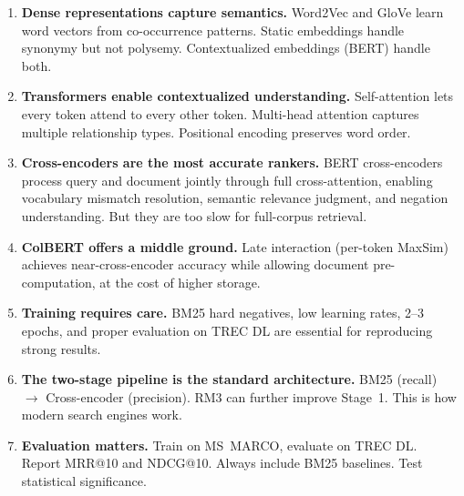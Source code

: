 \documentclass[11pt,a4paper]{article}
\theoremstyle{definition}
\theoremstyle{plain}
\begin{document}
\begin{enumerate}
    \item \textbf{Dense representations capture semantics.} Word2Vec and GloVe learn word vectors from co-occurrence patterns. Static embeddings handle synonymy but not polysemy. Contextualized embeddings (BERT) handle both.
    
    \item \textbf{Transformers enable contextualized understanding.} Self-attention lets every token attend to every other token. Multi-head attention captures multiple relationship types. Positional encoding preserves word order.
    
    \item \textbf{Cross-encoders are the most accurate rankers.} BERT cross-encoders process query and document jointly through full cross-attention, enabling vocabulary mismatch resolution, semantic relevance judgment, and negation understanding. But they are too slow for full-corpus retrieval.
    
    \item \textbf{ColBERT offers a middle ground.} Late interaction (per-token MaxSim) achieves near-cross-encoder accuracy while allowing document pre-computation, at the cost of higher storage.
    
    \item \textbf{Training requires care.} BM25 hard negatives, low learning rates, 2--3 epochs, and proper evaluation on TREC DL are essential for reproducing strong results.
    
    \item \textbf{The two-stage pipeline is the standard architecture.} BM25 (recall) $\to$ Cross-encoder (precision). RM3 can further improve Stage~1. This is how modern search engines work.
    
    \item \textbf{Evaluation matters.} Train on MS~MARCO, evaluate on TREC DL. Report MRR@10 and NDCG@10. Always include BM25 baselines. Test statistical significance.
\end{enumerate}
\end{document}
